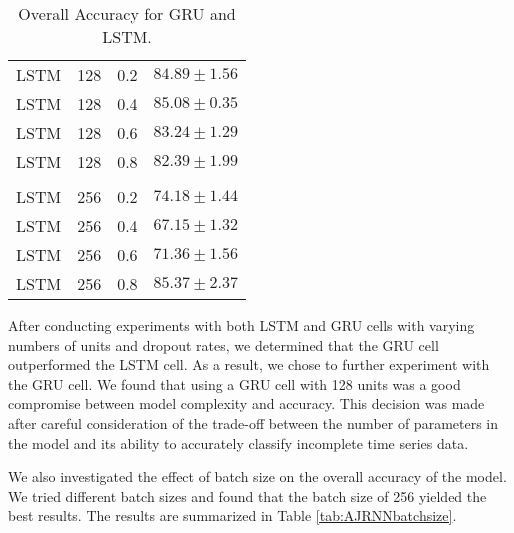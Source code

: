 \begin{table}[H]
\begin{tabular}{cccr}
      LSTM  &   128 & 0.2 &  $84.89 \pm 1.56$\\
      LSTM  &   128 & 0.4 &  $85.08 \pm 0.35$\\
      LSTM  &   128 & 0.6 &  $83.24 \pm 1.29$\\
      LSTM  &   128 & 0.8 &  $82.39 \pm 1.99$\\[0.05cm] \hline \\[-0.25cm]

      LSTM  &   256 & 0.2 &  $74.18 \pm 1.44$\\
      LSTM  &   256 & 0.4 &  $67.15 \pm 1.32$\\
      LSTM  &   256 & 0.6 &  $71.36 \pm 1.56$\\
      LSTM  &   256 & 0.8 &  $\mathbf{85.37 \pm 2.37}$\\ 
      
  \end{tabular}
  \caption{Overall Accuracy for GRU and LSTM.}
  \label{tab:AJRNNcelltype}
\end{table}

After conducting experiments with both LSTM and GRU cells with varying numbers of units and dropout rates, we determined that the GRU cell outperformed the LSTM cell.
As a result, we chose to further experiment with the GRU cell. 
We found that using a GRU cell with 128 units was a good compromise between model complexity and accuracy. 
This decision was made after careful consideration of the trade-off between the number of parameters in the model and its ability to accurately classify incomplete time series data.

We also investigated the effect of batch size on the overall accuracy of the model.
We tried different batch sizes and found that the batch size of 256 yielded the best results.
The results are summarized in Table \ref{tab:AJRNNbatchsize}.

